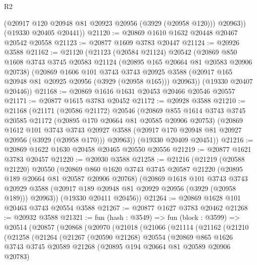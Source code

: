 \begin{lexlean}{R2}
\begin{coremodule}
          (@20917 @120 @20948 @81 @20923 @20956 (@3929 (@20958 @120)))
          @20963))
      (@19330 @20405 @20441))
@21120 := @20869 @1610 @1632 @20448 @20467 @20542 @20558
@21123 := @20877 @1609 @3783 @20447
@21124 := @20926 @3588
@21162 := @21120
    (@21123
      (@20584 @21124)
      @20542
      (@20869
        @850
        @1608
        @3743
        @3745
        @20583
        @21124
        (@20895 @165 @20664 @81 @20583 @20906 @20738)
        (@20869
          @1606
          @101
          @3743
          @3743
          @20925
          @3588
          (@20917 @165 @20948 @81 @20925 @20956 (@3929 (@20958 @165)))
          @20963))
      (@19330 @20407 @20446))
@21168 := @20869 @1616 @1631 @20453 @20466 @20546 @20557
@21171 := @20877 @1615 @3783 @20452
@21172 := @20928 @3588
@21210 := @21168
    (@21171
      (@20586 @21172)
      @20546
      (@20869
        @855
        @1614
        @3743
        @3745
        @20585
        @21172
        (@20895 @170 @20664 @81 @20585 @20906 @20753)
        (@20869
          @1612
          @101
          @3743
          @3743
          @20927
          @3588
          (@20917 @170 @20948 @81 @20927 @20956 (@3929 (@20958 @170)))
          @20963))
      (@19330 @20409 @20451))
@21216 := @20869 @1622 @1630 @20458 @20465 @20550 @20556
@21219 := @20877 @1621 @3783 @20457
@21220 := @20930 @3588
@21258 := @21216
    (@21219
      (@20588 @21220)
      @20550
      (@20869
        @860
        @1620
        @3743
        @3745
        @20587
        @21220
        (@20895 @189 @20664 @81 @20587 @20906 @20768)
        (@20869
          @1618
          @101
          @3743
          @3743
          @20929
          @3588
          (@20917 @189 @20948 @81 @20929 @20956 (@3929 (@20958 @189)))
          @20963))
      (@19330 @20411 @20456))
@21264 := @20869 @1628 @101 @20463 @3743 @20554 @3588
@21267 := @20877 @1627 @3783 @20462
@21268 := @20932 @3588
@21321 := fun (hash : @3549) =>
  fun (block : @3599) =>
  @20514
    (@20857
      (@20868
        (@20970
          (@21018
            (@21066
              (@21114
                (@21162
                  (@21210
                    (@21258
                      (@21264
                        (@21267
                          (@20590 @21268)
                          @20554
                          (@20869
                            @865
                            @1626
                            @3743
                            @3745
                            @20589
                            @21268
                            (@20895 @194 @20664 @81 @20589 @20906 @20783)

\end{coremodule}
\end{lexlean}
